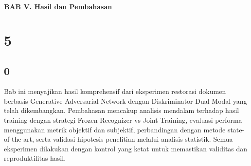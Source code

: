\documentclass[12pt,a4paper]{article}
\begin{document}

\vspace{2cm}
\begin{center}
{\fontsize{14}{16.8}\selectfont\textbf{BAB V. Hasil dan Pembahasan}}\\[1em]
\end{center}
\label{sec:hasil-pembahasan}
\section{5}
\subsection{0}
\vspace{2em}

Bab ini menyajikan hasil komprehensif dari eksperimen restorasi dokumen berbasis Generative Adversarial Network dengan Diskriminator Dual-Modal yang telah dikembangkan. Pembahasan mencakup analisis mendalam terhadap hasil training dengan strategi Frozen Recognizer vs Joint Training, evaluasi performa menggunakan metrik objektif dan subjektif, perbandingan dengan metode state-of-the-art, serta validasi hipotesis penelitian melalui analisis statistik. Semua eksperimen dilakukan dengan kontrol yang ketat untuk memastikan validitas dan reproduktifitas hasil.
\end{document}
